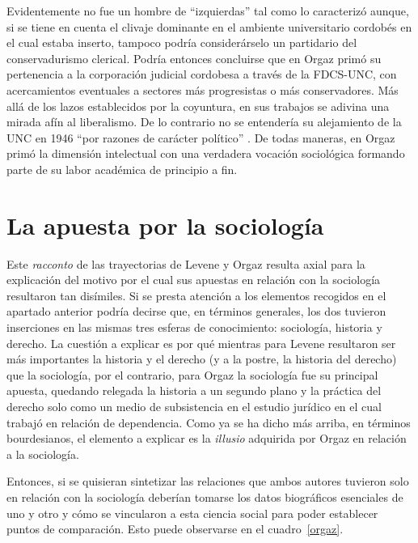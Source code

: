 Evidentemente no fue un hombre de \enquote{izquierdas} tal como lo caracterizó \textcite{1624-FERRERO1984} aunque, si se tiene en cuenta el clivaje dominante en el ambiente universitario cordobés en el cual estaba inserto, tampoco podría considerárselo un partidario del conservadurismo clerical. Podría entonces concluirse que en Orgaz primó su pertenencia a la corporación judicial cordobesa a través de la FDCS-UNC, con acercamientos eventuales a sectores más progresistas o más conservadores. Más allá de los lazos establecidos por la coyuntura, en sus trabajos se adivina una mirada afín al liberalismo. De lo contrario no se entendería su alejamiento de la UNC en 1946 \enquote{por razones de carácter político} \parencite[25]{1558-CHAMORROGRECA2007}. De todas maneras, en Orgaz primó la dimensión intelectual con una verdadera vocación sociológica formando parte de su labor académica de principio a fin.

\section{La apuesta por la sociología}

Este \emph{racconto} de las trayectorias de Levene y Orgaz resulta axial para la explicación del motivo por el cual sus apuestas en relación con la sociología resultaron tan disímiles. Si se presta atención a los elementos recogidos en el apartado anterior podría decirse que, en términos generales, los dos tuvieron inserciones en las mismas tres esferas de conocimiento: sociología, historia y derecho. La cuestión a explicar es por qué mientras para Levene resultaron ser más importantes la historia y el derecho (y a la postre, la historia del derecho) que la sociología, por el contrario, para Orgaz la sociología fue su principal apuesta, quedando relegada la historia a un segundo plano y la práctica del derecho solo como un medio de subsistencia en el estudio jurídico en el cual trabajó en relación de dependencia. Como ya se ha dicho más arriba, en términos bourdesianos, el elemento a explicar es la \emph{illusio} adquirida por Orgaz en relación a la sociología.

Entonces, si se quisieran sintetizar las relaciones que ambos autores tuvieron solo en relación con la sociología deberían tomarse los datos biográficos esenciales de uno y otro y cómo se vincularon a esta ciencia social para poder establecer puntos de comparación. Esto puede observarse en el cuadro~\ref{orgaz}.


